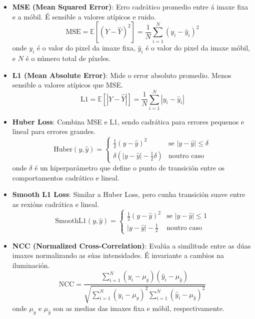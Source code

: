 \begin{itemize}
    \item \textbf{MSE (Mean Squared Error)}:
    Erro cadrático promedio entre á imaxe fixa e a móbil. É sensible a valores atípicos e ruido.
    \[
    \text{MSE} = \mathbb{E}[(Y - \hat{Y})^2] = \frac{1}{N} \sum_{i=1}^{N} (y_i - \hat{y}_i)^2
    \]
    onde \( y_i \) é o valor do pixel da imaxe fixa, \( \hat{y}_i \) é o valor do pixel da imaxe móbil, e \( N \) é o número total de píxeles. \cite{Palubinskas02012017}

    \item \textbf{L1 (Mean Absolute Error)}:
    Mide o error absoluto promedio. Menos sensible a valores atípicos que MSE.
    \[
    \text{L1} = \mathbb{E}[|Y - \hat{Y}|] = \frac{1}{N} \sum_{i=1}^{N} |y_i - \hat{y}_i|
    \]

    \item \textbf{Huber Loss}:
    Combina MSE e L1, sendo cadrática para errores pequenos e lineal para errores grandes.
    \[
    \text{Huber}(y, \hat{y}) = \begin{cases}
    \frac{1}{2}(y - \hat{y})^2 & \text{se } |y - \hat{y}| \leq \delta \\
    \delta(|y - \hat{y}| - \frac{1}{2}\delta) & \text{noutro caso}
    \end{cases}
    \]
    onde \( \delta \) é un hiperparámetro que define o punto de transición entre os comportamentos cadrático e lineal.

    \item \textbf{Smooth L1 Loss}:
    Similar a Huber Loss, pero cunha transición suave entre as rexións cadrática e lineal.
    \[
    \text{SmoothL1}(y, \hat{y}) = \begin{cases}
    \frac{1}{2}(y - \hat{y})^2 & \text{se } |y - \hat{y}| \leq 1 \\
    |y - \hat{y}| - \frac{1}{2} & \text{noutro caso}
    \end{cases}
    \]

    \item \textbf{NCC (Normalized Cross-Correlation)}:
    Evalúa a similitude entre as dúas imaxes normalizando as súas intensidades. É invariante a cambios na iluminación.
    \[
    \text{NCC} = \frac{\sum_{i=1}^{N} (y_i - \mu_y)(\hat{y}_i - \mu_{\hat{y}})}{\sqrt{\sum_{i=1}^{N} (y_i - \mu_y)^2 \sum_{i=1}^{N} (\hat{y}_i - \mu_{\hat{y}})^2}}
    \]
    onde \( \mu_y \) e \( \mu_{\hat{y}} \) son as medias das imaxes fixa e móbil, respectivamente.


\end{itemize}
